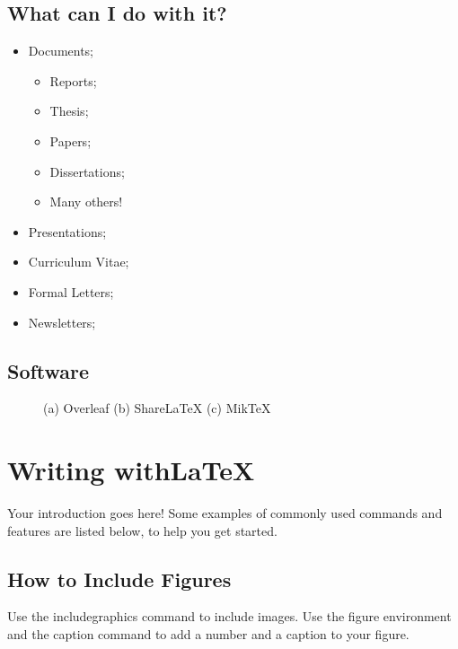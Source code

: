 \documentclass{article}
\begin{document}
\subsection{What can I do with it?}
\begin{itemize}
    \item Documents;
    \begin{itemize}
        \item Reports;
        \item Thesis;
        \item Papers;
        \item Dissertations;
        \item Many others!
    \end{itemize}
    \item Presentations;
    \item Curriculum Vitae;
    \item Formal Letters;
    \item Newsletters;


\end{itemize}


\subsection{Software}
\begin{figure}[h!]
\centering
{} 
\caption{(a) Overleaf (b) ShareLaTeX (c) MikTeX}
\end{figure}


\newpage    

\section{Writing with\LaTeX} \label{sec:examples}

Your introduction goes here! Some examples of commonly used commands and features are listed below, to help you get started.



\subsection{How to Include Figures}

Use the includegraphics command to include images. Use the figure environment and the caption command to add a number and a caption to your figure.
\end{document}
